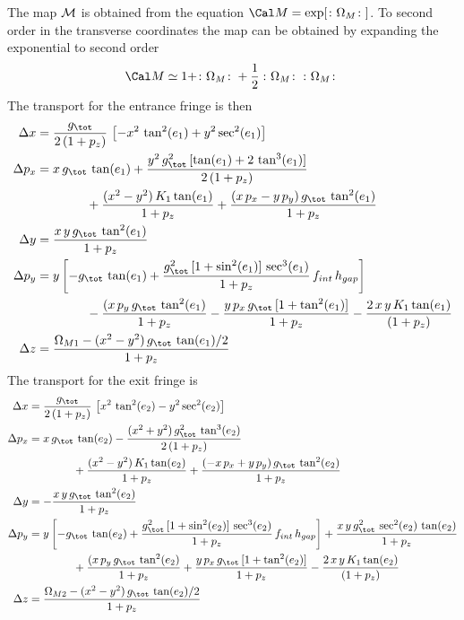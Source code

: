 The map $\cal M$ is obtained from the equation $\Cal M = \exp[\colon\Omega_M\colon]$. To second order in the
transverse coordinates the map can be obtained by expanding the exponential to second order
\begin{equation}
  \Cal M \simeq 1 + \colon\Omega_M\colon + \frac{1}{2} \, \colon\Omega_M\colon \, \colon\Omega_M\colon
\end{equation}
The transport for the entrance fringe is then
\begin{align}
  \Delta x &= \frac{g_\tot}{2 \, (1 + p_z)} \, \left[ -x^2 \, \tan^2 (e_1) + y^2 \sec^2 (e_1) \right] \CRNO
  \Delta p_x &= x \, g_\tot \, \tan (e_1)
    + \frac{y^2 \, g_\tot^2 \, [ \tan (e_1) + 2 \, \tan^3 (e_1) ]}{2 \, (1 + p_z)} \CRNO
    &\qquad\qquad + \frac{(x^2 - y^2) \, K_1 \tan (e_1)}{1 + p_z}
    + \frac{(x \, p_x - y \, p_y) \, g_\tot \, \tan^2 (e_1)}{1 + p_z} \CRNO
  \Delta y &= \frac{x \, y \, g_\tot \, \tan^2 (e_1)}{1 + p_z} \\
  \Delta p_y &= y \left[ -g_\tot \, \tan (e_1)
    + \frac{g^2_\tot \, [1 + \sin^2 (e_1)] \, \sec^3 (e_1)}{1 + p_z} \, f_{int} \,  h_{gap} \right] \CRNO
    &\qquad\qquad - \frac{(x \, p_y \, g_\tot \, \tan^2 (e_1)}{1 + p_z} 
    - \frac{y \, p_x \, g_\tot \, [1 + \tan^2 (e_1)]}{1 + p_z} 
    - \frac{2 \, x \, y \, K_1 \tan (e_1)}{(1 + p_z)} \CRNO
  \Delta z &= \frac{\Omega_{M1} - (x^2 - y^2) \, g_\tot \, \tan (e_1)/2}{1 + p_z} \nonumber
\end{align}
The transport for the exit fringe is
\begin{align}
  \Delta x &= \frac{g_\tot}{2 \, (1 + p_z)} \, \left[ x^2 \, \tan^2 (e_2) - y^2 \sec^2 (e_2) \right] \CRNO
  \Delta p_x &= x \, g_\tot \, \tan (e_2)
    - \frac{(x^2 + y^2) \, g_\tot^2 \, \tan^3 (e_2)}{2 \, (1 + p_z)} \CRNO
    &\qquad\qquad + \frac{(x^2 - y^2) \, K_1 \tan (e_2)}{1 + p_z}
    + \frac{(-x \, p_x + y \, p_y) \, g_\tot \, \tan^2 (e_2)}{1 + p_z} \CRNO
  \Delta y &= -\frac{x \, y \, g_\tot \, \tan^2 (e_2)}{1 + p_z} \\
  \Delta p_y &= y \left[ -g_\tot \, \tan (e_2)
    + \frac{g^2_\tot \, [1 + \sin^2 (e_2)] \, \sec^3 (e_2)}{1 + p_z} \, f_{int} \,  h_{gap} \right]
    + \frac{x \, y \, g^2_\tot \, \sec^2 (e_2) \, \tan (e_2)}{1 + p_z} \CRNO
    &\qquad\qquad + \frac{(x \, p_y \, g_\tot \, \tan^2 (e_2)}{1 + p_z} 
    + \frac{y \, p_x \, g_\tot \, [1 + \tan^2 (e_2)]}{1 + p_z} 
    - \frac{2 \, x \, y \, K_1 \tan (e_2)}{(1 + p_z)} \CRNO
  \Delta z &= \frac{\Omega_{M2} - (x^2 - y^2) \, g_\tot \, \tan (e_2)/2}{1 + p_z} \nonumber
\end{align}


